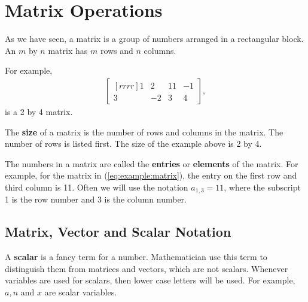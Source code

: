 %
%
%
%
%
%
%
%
%
%
%
%
%



\vfill \pagebreak

\section{Matrix Operations}
\label{sect:matrix:operations}

As we have seen, a matrix is a group of numbers arranged in a rectangular block.  An $m$ by $n$ matrix has $m$ rows and $n$ columns.

For example,
%
\begin{align}
\begin{bmatrix}[rrrr]
1 & 2 & 11 & -1 \\ 3 & -2 & 3 & 4
\end{bmatrix}, \label{eq:example:matrix}
\end{align}
is a 2 by 4 matrix.

The \textbf{size} of a matrix is the number of rows and columns in the matrix.  The number of rows is listed first.  The size of the example above is 2 by 4.

The numbers in a matrix are called the \textbf{entries} or \textbf{elements} of the matrix.  For example, for the matrix in (\ref{eq:example:matrix}), the entry on the first row and third column is 11.  Often we will use the notation $a_{1,3} = 11$, where the subscript 1 is the row number and $3$ is the column number.

\subsection{Matrix, Vector and Scalar Notation}

A \textbf{scalar} is a fancy term for a number.  Mathematician use this term to distinguish them from matrices and vectors, which are not scalars.  Whenever variables are used for scalars, then lower case letters will be used.  For example, $a, n$ and $x$ are scalar variables.

